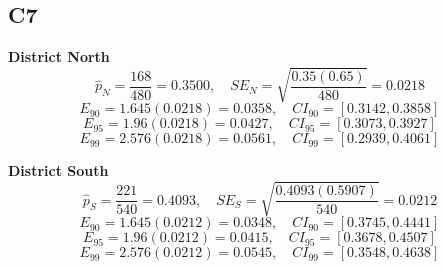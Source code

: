 \begin{ExamProblems}
		\subsection*{C7}
		\textbf{District North}
		\[
		\hat{p}_N=\frac{168}{480}=0.3500,
		\quad SE_N=\sqrt{\frac{0.35(0.65)}{480}}=0.0218
		\]
		\[
		E_{90}=1.645(0.0218)=0.0358,\quad CI_{90}=[0.3142,0.3858]
		\]
		\[
		E_{95}=1.96(0.0218)=0.0427,\quad CI_{95}=[0.3073,0.3927]
		\]
		\[
		E_{99}=2.576(0.0218)=0.0561,\quad CI_{99}=[0.2939,0.4061]
		\]
		
		\textbf{District South}
		\[
		\hat{p}_S=\frac{221}{540}=0.4093,
		\quad SE_S=\sqrt{\frac{0.4093(0.5907)}{540}}=0.0212
		\]
		\[
		E_{90}=1.645(0.0212)=0.0348,\quad CI_{90}=[0.3745,0.4441]
		\]
		\[
		E_{95}=1.96(0.0212)=0.0415,\quad CI_{95}=[0.3678,0.4507]
		\]
		\[
		E_{99}=2.576(0.0212)=0.0545,\quad CI_{99}=[0.3548,0.4638]
		\]
		
	\end{ExamProblems}
	

